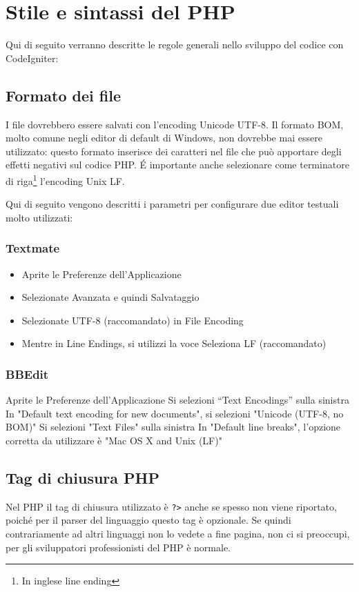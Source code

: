 \chapter{Stile e sintassi del PHP}
\label{cap:stile}

Qui di seguito verranno descritte le regole generali nello sviluppo del codice con CodeIgniter:

\section{Formato dei file}
I file dovrebbero essere salvati con l'encoding Unicode UTF-8. Il formato BOM, molto comune negli editor di default di Windows, non dovrebbe mai essere utilizzato: questo formato inserisce dei caratteri nel file che può apportare degli effetti negativi sul codice PHP. \'E importante anche selezionare come terminatore di riga\footnote{In inglese line ending} l'encoding Unix LF.

Qui di seguito vengono descritti i parametri per configurare due editor testuali molto utilizzati:

\subsection*{Textmate}
\begin{itemize}
\item Aprite le Preferenze dell'Applicazione
\item Selezionate Avanzata e quindi Salvataggio
\item Selezionate UTF-8 (raccomandato) in File Encoding
\item Mentre in Line Endings, si utilizzi la voce Seleziona LF (raccomandato)
\end{itemize}

\subsection*{BBEdit}
Aprite le Preferenze dell'Applicazione
Si selezioni ``Text Encodings'' sulla sinistra
In "Default text encoding for new documents", si selezioni "Unicode (UTF-8, no BOM)"
Si selezioni "Text Files" sulla sinistra
In "Default line breaks", l'opzione corretta da utilizzare è "Mac OS X and Unix (LF)"

\section{Tag di chiusura PHP}
Nel PHP il tag di chiusura utilizzato è \verb|?>| anche se spesso non viene riportato, poiché per il parser del linguaggio questo tag è opzionale. Se quindi contrariamente ad altri linguaggi non lo vedete a fine pagina, non ci si preoccupi, per gli sviluppatori professionisti del PHP è normale.

